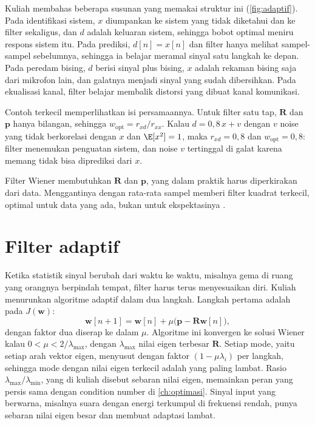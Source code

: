 Kuliah membahas beberapa susunan yang memakai struktur ini (\cref{fig:adaptif}). Pada identifikasi
sistem, $x$ diumpankan ke sistem yang tidak diketahui dan ke filter sekaligus, dan $d$ adalah keluaran
sistem, sehingga bobot optimal meniru respons sistem itu. Pada prediksi, $d[n]=x[n]$ dan filter hanya
melihat sampel-sampel sebelumnya, sehingga ia belajar meramal sinyal satu langkah ke depan. Pada
peredam bising, $d$ berisi sinyal plus bising, $x$ adalah rekaman bising saja dari mikrofon lain, dan
galatnya menjadi sinyal yang sudah dibersihkan. Pada ekualisasi kanal, filter belajar membalik distorsi
yang dibuat kanal komunikasi.

Contoh terkecil memperlihatkan isi persamaannya. Untuk filter satu tap, $\bm R$ dan $\bm p$ hanya
bilangan, sehingga $w_{\mathrm{opt}}=r_{xd}/r_{xx}$. Kalau $d=0{,}8\,x+v$ dengan $v$ noise yang tidak
berkorelasi dengan $x$ dan $\E[x^2]=1$, maka $r_{xd}=0{,}8$ dan $w_{\mathrm{opt}}=0{,}8$: filter menemukan
penguatan sistem, dan noise $v$ tertinggal di galat karena memang tidak bisa diprediksi dari $x$.

Filter Wiener membutuhkan $\bm R$ dan $\bm p$, yang dalam praktik harus diperkirakan dari data. Menggantinya
dengan rata-rata sampel memberi filter kuadrat terkecil, optimal untuk data yang ada, bukan untuk
ekspektasinya \citep{manolakis2005}.

\section{Filter adaptif}

Ketika statistik sinyal berubah dari waktu ke waktu, misalnya gema di ruang yang orangnya berpindah
tempat, filter harus terus menyesuaikan diri. Kuliah menurunkan algoritme adaptif dalam dua langkah.
Langkah pertama adalah  pada $J(\bm w)$:
\begin{equation}
\bm w[n+1]=\bm w[n]+\mu\big(\bm p-\bm R\bm w[n]\big),
\end{equation}
dengan faktor dua diserap ke dalam $\mu$. Algoritme ini konvergen ke solusi Wiener kalau
$0<\mu<2/\lambda_{\max}$, dengan $\lambda_{\max}$ nilai eigen terbesar $\bm R$. Setiap mode, yaitu setiap arah
vektor eigen, menyusut dengan faktor $(1-\mu\lambda_i)$ per langkah, sehingga mode dengan nilai eigen
terkecil adalah yang paling lambat. Rasio $\lambda_{\max}/\lambda_{\min}$, yang di kuliah disebut sebaran
nilai eigen, memainkan peran yang persis sama dengan condition number di \cref{ch:optimasi}. Sinyal input
yang berwarna, misalnya suara dengan energi terkumpul di frekuensi rendah, punya sebaran nilai
eigen besar dan membuat adaptasi lambat.


